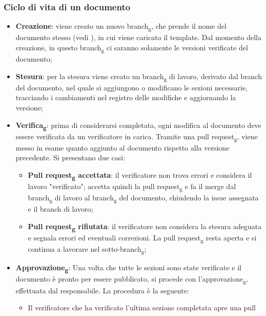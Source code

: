 \subsubsection{Ciclo di vita di un documento}
\begin{itemize}
      \item \textbf{Creazione}: viene creato un nuovo branch\textsubscript{g}, che prende il nome del documento stesso
            (vedi ), in cui viene caricato il template. Dal momento della creazione, in questo
            branch\textsubscript{g} ci saranno solamente le versioni verificate del documento;
      \item \textbf{Stesura}: per la stesura viene creato un branch\textsubscript{g} di lavoro, derivato dal branch del documento, nel quale si aggiungono o modificano le
            sezioni necessarie, tracciando i cambiamenti nel registro delle modifiche e aggiornando la versione;
      \item \textbf{Verifica\textsubscript{g}}: prima di considerarsi completata, ogni modifica al documento deve essere verificata da un verificatore in carica.
            Tramite una pull request\textsubscript{g}, viene messo in esame quanto aggiunto al documento rispetto alla versione precedente. Si presentano due casi:
            \begin{itemize}
                  \item \textbf{Pull request\textsubscript{g} accettata}: il verificatore non trova errori e considera il lavoro "verificato";
                        accetta quindi la pull request\textsubscript{g} e fa il merge dal branch\textsubscript{g} di lavoro al branch\textsubscript{g} del documento, chiudendo la issue assegnata e il branch di lavoro;
                  \item \textbf{Pull request\textsubscript{g} rifiutata}: il verificatore non considera la stesura adeguata e segnala errori
                        ed eventuali correzioni. La pull request\textsubscript{g} resta aperta e si continua a lavorare nel sotto-branch\textsubscript{g};
            \end{itemize}
      \item \textbf{Approvazione\textsubscript{g}}: Una volta che tutte le sezioni sono state verificate e il documento è pronto per essere pubblicato,
            si procede con l'approvazione\textsubscript{g}, effettuata dal responsabile. La procedura è la seguente:
            \begin{itemize}
                  \item Il verificatore che ha verificato l'ultima sezione completata apre una pull

\end{itemize}
\end{itemize}
